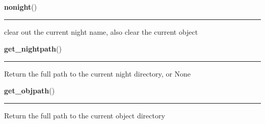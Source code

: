     \label{xdir:nonight}

    \vspace{0.5ex}

    \begin{boxedminipage}{\textwidth}

    \raggedright \textbf{nonight}()

    \vspace{-1.5ex}

    \rule{\textwidth}{0.5\fboxrule}
    clear out the current night name, also clear the current object

    \vspace{1ex}

    \end{boxedminipage}

    \label{xdir:get_nightpath}

    \vspace{0.5ex}

    \begin{boxedminipage}{\textwidth}

    \raggedright \textbf{get\_nightpath}()

    \vspace{-1.5ex}

    \rule{\textwidth}{0.5\fboxrule}
    Return the full path to the current night directory, or None

    \vspace{1ex}

    \end{boxedminipage}

    \label{xdir:get_objpath}

    \vspace{0.5ex}

    \begin{boxedminipage}{\textwidth}

    \raggedright \textbf{get\_objpath}()

    \vspace{-1.5ex}

    \rule{\textwidth}{0.5\fboxrule}
    Return the full path to the current object directory

    \vspace{1ex}

    \end{boxedminipage}

